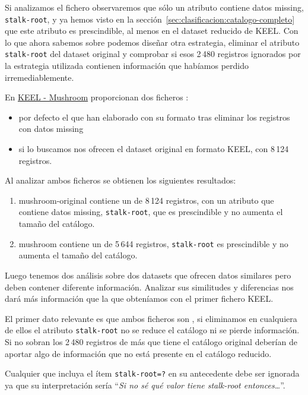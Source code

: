 Si analizamos el fichero \mushroom observaremos que sólo un atributo contiene datos missing, \texttt{stalk-root}, y ya hemos visto en la sección~\ref{sec:clasificacion:catalogo-completo} que este atributo es prescindible, al menos en el dataset reducido de KEEL. Con lo que ahora sabemos sobre \catalogos podemos diseñar otra estrategia, eliminar el atributo \texttt{stalk-root} del dataset original y comprobar si esos 2\,480 registros ignorados por la estrategia utilizada contienen información que habíamos perdido irremediablemente.

En \href{http://sci2s.ugr.es/keel/dataset.php?cod=178}{KEEL - Mushroom} proporcionan dos ficheros \mushroom:
\begin{itemize}
  \item por defecto el que han elaborado con su formato tras eliminar los registros con datos missing
  \item si lo buscamos nos ofrecen el dataset original en formato KEEL, con 8\,124 registros.
\end{itemize}

Al analizar ambos ficheros se obtienen los siguientes resultados:
\begin{enumerate}
  \item mushroom-original contiene un \CC de 8\,124 registros, con un atributo que contiene datos missing, \texttt{stalk-root}, que es prescindible y no aumenta el tamaño del catálogo.
  \item mushroom contiene un \CC de 5\,644 registros, \texttt{stalk-root} es prescindible y no aumenta el tamaño del catálogo.
\end{enumerate}
Luego tenemos dos análisis sobre dos datasets que ofrecen datos similares pero deben contener diferente información. Analizar sus similitudes y diferencias nos dará más información que la que obteníamos con el primer fichero KEEL.

El primer dato relevante es que ambos ficheros son \CCs, si eliminamos en cualquiera de ellos el atributo \texttt{stalk-root} no se reduce el catálogo ni se pierde información. Si no sobran los 2\,480 registros de más que tiene el catálogo original deberían de aportar algo de información que no está presente en el catálogo reducido.

Cualquier \ar que incluya el ítem \texttt{stalk-root=?} en su antecedente debe ser ignorada ya que su interpretación sería "`\emph{Si no sé qué valor tiene stalk-root entonces\ldots}"'.


